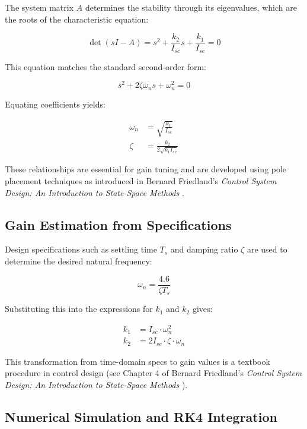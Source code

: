\documentclass{ifacconf}
\begin{document}
The system matrix $A$ determines the stability through its eigenvalues, which are the roots of the characteristic equation:

\begin{equation}
\det(sI - A) = s^2 + \frac{k_2}{I_{sc}}s + \frac{k_1}{I_{sc}} = 0
\end{equation}

This equation matches the standard second-order form:

\begin{equation}
s^2 + 2\zeta\omega_n s + \omega_n^2 = 0
\end{equation}

Equating coefficients yields:

\begin{align}
\omega_n &= \sqrt{\frac{k_1}{I_{sc}}} \\
\zeta &= \frac{k_2}{2\sqrt{k_1 I_{sc}}}
\end{align}

These relationships are essential for gain tuning and are developed using pole placement techniques as introduced in Bernard Friedland's \textit{Control System Design: An Introduction to State-Space Methods} \citep{Friedland2005}.

\subsection{Gain Estimation from Specifications}

Design specifications such as settling time $T_s$ and damping ratio $\zeta$ are used to determine the desired natural frequency:

\begin{equation}
\omega_n = \frac{4.6}{\zeta T_s}
\end{equation}

Substituting this into the expressions for $k_1$ and $k_2$ gives:

\begin{align}
k_1 &= I_{sc} \cdot \omega_n^2 \\
k_2 &= 2 I_{sc} \cdot \zeta \cdot \omega_n
\end{align}

This transformation from time-domain specs to gain values is a textbook procedure in control design (see Chapter 4 of Bernard Friedland's \textit{Control System Design: An Introduction to State-Space Methods} \citep{Friedland2005}).

\subsection{Numerical Simulation and RK4 Integration}
\end{document}
